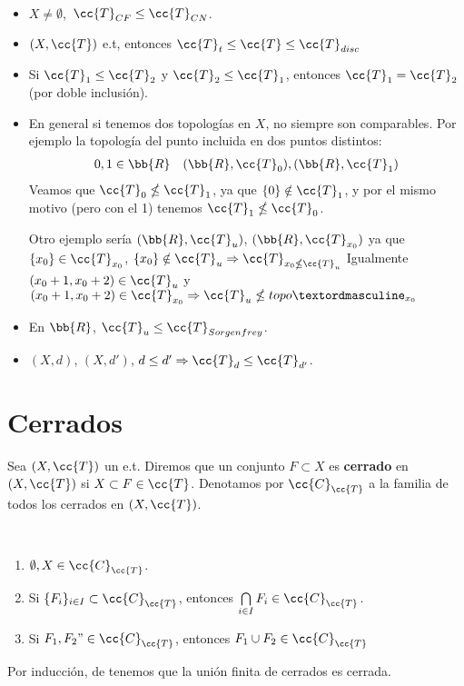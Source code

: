 \begin{ejemplo}\
    \begin{itemize}
        \item $X \neq \emptyset$,\ $\cc{T}_{CF}\leq \cc{T}_{CN}$.
        \item $(X,\cc{T})$ e.t, entonces $\cc{T}_t \leq \cc{T} \leq \cc{T}_{disc}$ 
        \item Si $\cc{T}_1 \leq \cc{T}_2$ y $\cc{T}_2\leq \cc{T}_1$, entonces $\cc{T}_1= \cc{T}_2$ (por doble inclusión).
        \item En general si tenemos dos topologías en $X$, no siempre son comparables. Por ejemplo la topología del punto incluida en dos puntos distintos: 
        \begin{gather*}
            0,1\in \bb{R}\ \ \ (\bb{R}, \cc{T}_0), (\bb{R},\cc{T}_1)
        \end{gather*}
        Veamos que $\cc{T}_0 \nleq \cc{T}_1$, ya que $\{0\}\notin \cc{T}_1$, y por el mismo motivo (pero con el 1) tenemos $\cc{T}_1\nleq \cc{T}_0$.

        Otro ejemplo sería $(\bb{R}, \cc{T}_u)$, $(\bb{R},\cc{T}_{x_0})$ ya que $\{x_0\}\in \cc{T}_{x_0}$, $\{x_0\}\notin \cc{T}_u\Rightarrow \cc{T}_{x_0\nleq \cc{T}_u}$
        Igualmente $(x_0+1,x_0+2)\in \cc{T}_u$ y $(x_0+1,x_0+2)\in \cc{T}_{x_0} \Rightarrow \cc{T}_u \nleq topoº_{x_0}$
        \item En $\bb{R}$, $\cc{T}_u\leq \cc{T}_{Sorgenfrey}$.
        \item $(X,d)$, $(X,d')$, $d \leq d' \Rightarrow \cc{T}_d \leq \cc{T}_{d'}$.
    \end{itemize}
    \endsquare
\end{ejemplo}

\section{Cerrados}

\begin{definicion}
    Sea $(X,\cc{T})$ un e.t. Diremos que un conjunto $F\subset X$ es \textbf{cerrado} en $(X,\cc{T})$ si $X\subset F \in \cc{T}$. Denotamos por $\cc{C}_{\cc{T}}$ a la familia de todos los cerrados en $(X,\cc{T})$.
    \endsquare
\end{definicion}

\begin{propiedades}\ 
    \begin{enumerate}
        \item[\objetivo{C1}] $\emptyset, X \in \cc{C}_{\cc{T}}$.
        \item[\objetivo{C2}] Si $\{F_i\}_{i\in I}\subset \cc{C}_{\cc{T}}$, entonces $\bigcap\limits_{i\in I}F_i \in \cc{C}_{\cc{T}}$.
        \item[\objetivo{C3}] Si $F_1, F_2" \in \cc{C}_{\cc{T}}$, entonces $F_1 \cup F_2 \in \cc{C}_{\cc{T}}$
    \end{enumerate}
    Por inducción, de \apuntar{C3} tenemos que la unión finita de cerrados es cerrada.\\
\end{propiedades}

